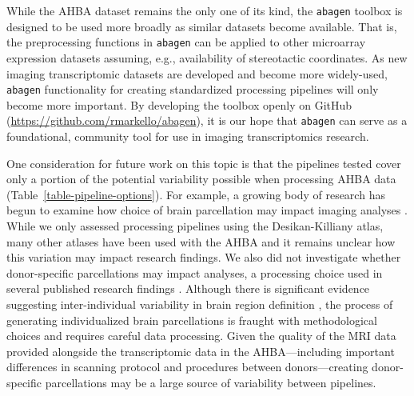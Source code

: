 \documentclass[12pt,aps,pra,reprint,showkeys]{revtex4-1}
\begin{document}
While the AHBA dataset remains the only one of its kind, the \texttt{abagen} toolbox is designed to be used more broadly as similar datasets become available.
That is, the preprocessing functions in \texttt{abagen} can be applied to other microarray expression datasets assuming, e.g., availability of stereotactic coordinates.
As new imaging transcriptomic datasets are developed and become more widely-used, \texttt{abagen} functionality for creating standardized processing pipelines will only become more important.
By developing the toolbox openly on GitHub (\url{https://github.com/rmarkello/abagen}), it is our hope that \texttt{abagen} can serve as a foundational, community tool for use in imaging transcriptomics research.

One consideration for future work on this topic is that the pipelines tested cover only a portion of the potential variability possible when processing AHBA data (Table~\ref{table-pipeline-options}).
For example, a growing body of research has begun to examine how choice of brain parcellation may impact imaging analyses \citep[e.g.,][]{craddock2012hbm,thirion2014frontneurosci, messe2020hbm, markello2021neuroimage}.
While we only assessed processing pipelines using the Desikan-Killiany atlas, many other atlases have been used with the AHBA and it remains unclear how this variation may impact research findings.
We also did not investigate whether donor-specific parcellations may impact analyses, a processing choice used in several published research findings \citep{anderson2020pnas, romerogarcia2018neuroimage, burt2018natneuro}.
Although there is significant evidence suggesting inter-individual variability in brain region definition \citep[e.g.,][]{gordon2017neuron, kong2019cercor, dickie2018biolpsych}, the process of generating individualized brain parcellations is fraught with methodological choices and requires careful data processing.
Given the quality of the MRI data provided alongside the transcriptomic data in the AHBA---including important differences in scanning protocol and procedures between donors---creating donor-specific parcellations may be a large source of variability between pipelines.
\end{document}
